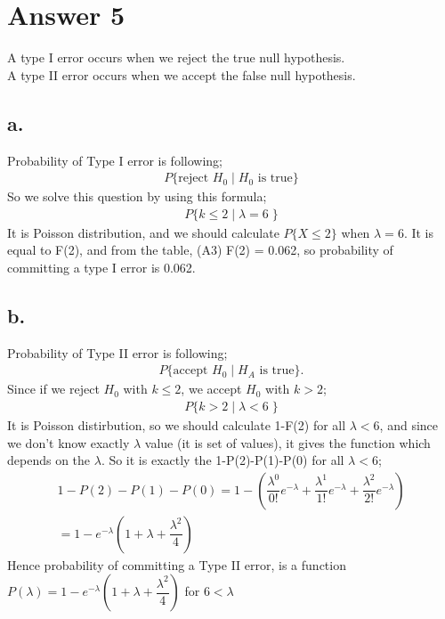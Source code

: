 \documentclass[12pt]{article}
\begin{document}
\section*{Answer 5}
A type I error occurs when we reject the true null hypothesis. \\
A type II error occurs when we accept the false null hypothesis. 
\subsection*{a.}
Probability of Type I error is following;
\begin{gather*}
    P \{\text{reject $H_0$}\; | \; \text{$H_0$ is true}\}
\end{gather*}
So we solve this question by using this formula;
\begin{gather*}
    P\{k \leq 2 \; | \; \lambda = 6\;\} 
\end{gather*}
It is Poisson distribution, and we should calculate $P\{X\leq 2\}$ when $\lambda = 6$. It is equal to F(2), and from the table, (A3) F(2) = 0.062, so probability of committing a type I error is 0.062.
\subsection*{b.}
Probability of Type II error is following;
\begin{gather*}
    P \{\text{accept $H_0$} \; | \; \text{$H_A$ is true} \} .
\end{gather*}
Since if we reject $H_0$ with $k\leq 2$, we accept $H_0$ with $k > 2$;
\begin{gather*}
    P\{k > 2 \; | \; \lambda < 6\;\}
\end{gather*}
It is Poisson distirbution, so we should calculate 1-F(2) for all $\lambda < 6$, and since we don't know exactly $\lambda$ value (it is set of values), it gives the function which depends on the $\lambda$. So it is exactly the 1-P(2)-P(1)-P(0) for all $\lambda < 6$;
\begin{gather*}
    1-P(2)-P(1)-P(0) = 1-(\dfrac{\lambda^0}{0!}e^{-\lambda}+\dfrac{\lambda^1}{1!}e^{-\lambda}+\dfrac{\lambda^2}{2!}e^{-\lambda}) \\
    =1-e^{-\lambda}(1+\lambda+\dfrac{\lambda^2}{4}) 
\end{gather*}
Hence probability of committing a Type II error, is a function $P(\lambda) = 1-e^{-\lambda}(1+\lambda+\dfrac{\lambda^2}{4})  $ for $6<\lambda$
\end{document}
